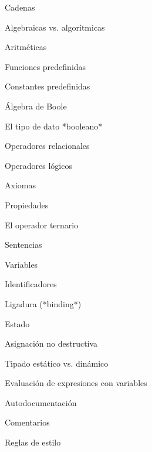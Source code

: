 \begin{longenum}
\begin{longenum}
\begin{longenum}
\begin{longenum}
\begin{longenum}
\begin{longenum}
                    \end{longenum}
                    \item Cadenas
                \end{longenum}
            \end{longenum}
            \item Algebraicas vs. algorítmicas
            \item Aritméticas
            \item Funciones predefinidas
            \item Constantes predefinidas
        \end{longenum}
        \item Álgebra de Boole
        \begin{longenum}
            \item El tipo de dato *booleano*
            \item Operadores relacionales
            \item Operadores lógicos
            \item Axiomas
            \item Propiedades
            \item El operador ternario
        \end{longenum}
        \item Sentencias
        \begin{longenum}
            \item Variables
            \begin{longenum}
                \item Identificadores
                \item Ligadura (*binding*)
                \item Estado
                \item Asignación no destructiva
                \item Tipado estático vs. dinámico
            \end{longenum}
            \item Evaluación de expresiones con variables
        \end{longenum}
        \item Autodocumentación
        \begin{longenum}
            \item Comentarios
            \item Reglas de estilo
        \end{longenum}
    \end{longenum}

\end{longenum}
